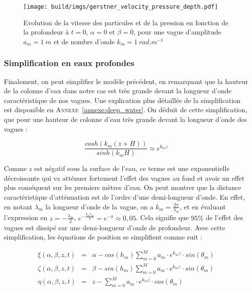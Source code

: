				\begin{figure}[!htb]
					\centering
					\texttt{[image: build/imgs/gerstner\_velocity\_pressure\_depth.pdf]}
					\caption{Evolution de la vitesse des particules et de la pression en fonction de la profondeur à $t=0$, $\alpha=0$ et $\beta=0$, pour une vague d'amplitude $a_m=1\ m$ et de nombre d'onde $k_m = 1\ rad.m^{-1}$}
					\label{fig:speed_pressure_depth}
				\end{figure}

			\subsubsection{Simplification en eaux profondes}
			\label{sec:simplification_eaux_profondes}
			
				Finalement, on peut simplifier le modèle précédent, en remarquant que la hauteur de la colonne d'eau dans notre cas est très grande devant la longueur d'onde caractéristique de nos vagues. Une explication plus détaillée de la simplification est disponible en \textsc{Annexe}~\ref{annexe:deep_water}. On déduit de cette simplification, que pour une hauteur de colonne d'eau très grande devant la longueur d'onde des vagues :

				\begin{equation}\frac{cosh(k_m(z+H))}{sinh(k_mH)} \approx e^{k_mz} \label{eqn:simplification_eaux_profondes}\end{equation}

				Comme $z$ est négatif sous la surface de l'eau, ce terme est une exponentielle décroissante qui va atténuer fortement l'effet des vagues au fond et avoir un effet plus conséquent sur les premiers mètres d'eau. On peut montrer que la distance caractéristique d'atténuation est de l'ordre d'une demi-longueur d'onde. En effet, en notant $\lambda_m$ la longueur d'onde de la vague, on a $k_m = \tfrac{2\pi}{\lambda_m}$, et en évaluant l'expression en $z = - \tfrac{\lambda_m}{2}$, $e^{-\tfrac{k_m\lambda_m}{2}} = e^{-\pi} \approx 0,05$. Cela signifie que $95 \%$ de l'effet des vagues est dissipé sur une demi-longueur d'onde de profondeur. Avec cette simplification, les équations de position se simplifient comme suit :
			
				\begin{eqnarray}
					\xi(\alpha, \beta, z, t) & = & \alpha - cos(h_m) \sum_{m=0}^M a_m \cdot e^{k_mz} \cdot sin(\theta_m) \\
					\zeta(\alpha, \beta, z, t) & = & \beta - sin(h_m) \sum_{m=0}^M a_m \cdot e^{k_mz} \cdot sin(\theta_m) \\
					\eta(\alpha, \beta, z, t) & = & z - \sum_{m=0}^M a_m \cdot e^{k_mz} \cdot cos(\theta_m) \\
				\end{eqnarray}

